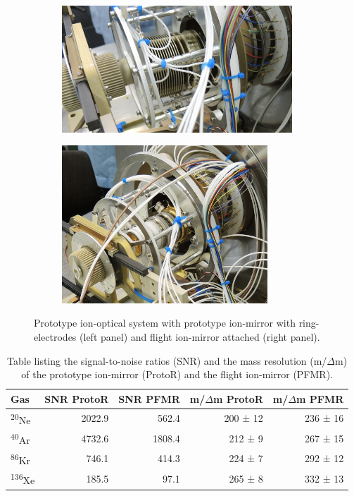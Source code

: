 	\begin{figure}[H]
		\begin{subfigure}{0.5\textwidth}
			\centering
			\includegraphics[width = 0.95\textwidth]{Experiments/reflectron_Prototype1.jpg}
		\end{subfigure}
		\begin{subfigure}{0.5\textwidth}
			\centering
			\includegraphics[width = 0.85\textwidth]{Experiments/reflectron_flight.JPG}
		\end{subfigure}
		\caption{Prototype ion-optical system with prototype ion-mirror with ring-electrodes (left panel) and flight ion-mirror attached (right panel).}
		\label{fig:ExpRefl}
	\end{figure}
	\begin{table}[H]
		\begin{center}
		\begin{tabular}{|l|r|r|r|r|}
			\hline
			Gas						&SNR ProtoR	&SNR PFMR	&m/$\Delta$m ProtoR	&m/$\Delta$m PFMR\\
			\hline
			\textsuperscript{20}Ne	&2022.9		&562.4		&200 ± 12		&236 ± 16\\
			\textsuperscript{40}Ar	&4732.6		&1808.4		&212 ±  9		&267 ± 15\\
			\textsuperscript{86}Kr	&746.1		&414.3		&224 ±  7		&292 ± 12\\
			\textsuperscript{136}Xe	&185.5		&97.1		&265 ±  8		&332 ± 13\\
			\hline
		\end{tabular}
		\end{center}
		\caption{Table listing the signal-to-noise ratios (SNR) and the mass resolution (m/$\Delta$m) of the prototype ion-mirror (ProtoR) and the flight ion-mirror (PFMR).}
		\label{tab:refPerftab}
	\end{table}
